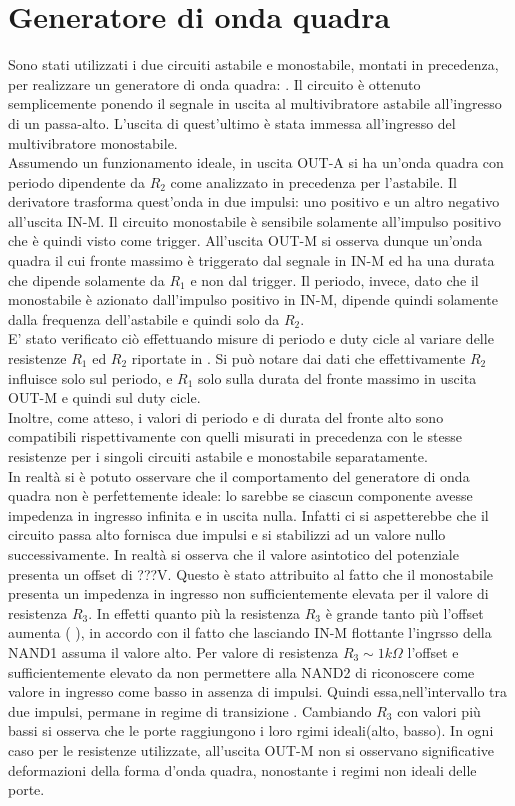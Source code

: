 \section{Generatore di onda quadra}
Sono stati utilizzati i due circuiti astabile e monostabile, montati in precedenza, per realizzare un generatore di onda quadra: . Il circuito è ottenuto semplicemente ponendo il segnale in uscita al multivibratore astabile all'ingresso di un passa-alto. L'uscita di quest'ultimo è stata immessa all'ingresso del multivibratore monostabile. \\
Assumendo un funzionamento ideale, in uscita OUT-A si ha un'onda quadra con periodo dipendente da $R_{2}$ come analizzato in precedenza per l'astabile. Il derivatore trasforma quest'onda in due impulsi: uno positivo e un altro negativo all'uscita IN-M. Il circuito monostabile è sensibile solamente all'impulso positivo che è quindi visto come trigger.
 All'uscita OUT-M si osserva dunque un'onda quadra il cui fronte massimo è triggerato dal segnale in IN-M ed ha una durata che dipende solamente da $R_{1}$ e non dal trigger. Il periodo, invece, dato che il monostabile è azionato dall'impulso positivo in IN-M, dipende quindi solamente dalla frequenza dell'astabile e quindi solo da $R_{2}$.\\
 E' stato verificato ciò effettuando misure di periodo e duty cicle al variare delle resistenze $R_{1}$ ed $R_{2}$ riportate in \tab{}. Si può notare dai dati che effettivamente $R_{2}$ influisce solo sul periodo, e $R_{1}$ solo sulla durata del fronte massimo in uscita OUT-M e quindi sul duty cicle. \\
 Inoltre, come atteso, i valori di periodo e di durata del fronte alto sono compatibili rispettivamente con quelli misurati in precedenza con le stesse resistenze per i singoli circuiti astabile e monostabile separatamente.\\
 In realtà si è potuto osservare che il comportamento del generatore di onda quadra non è perfettemente ideale: lo sarebbe se ciascun componente avesse impedenza in ingresso infinita e in uscita nulla. Infatti ci si aspetterebbe che il circuito passa alto fornisca due impulsi e si stabilizzi ad un valore nullo successivamente. In realtà si osserva che il valore asintotico del potenziale presenta un offset di ???V. Questo è stato attribuito al fatto che il monostabile presenta un impedenza in ingresso non sufficientemente elevata per il valore di resistenza $R_{3}$. In effetti quanto più la resistenza $R_{3}$ è grande tanto più l'offset aumenta (\tab{} ), in accordo con il fatto che lasciando IN-M flottante l'ingrsso della NAND1 assuma il valore alto. Per valore di resistenza $R_{3} \sim 1 k\Omega$ l'offset e sufficientemente elevato da non permettere alla NAND2 di riconoscere come valore in ingresso come basso in assenza di impulsi. Quindi essa,nell'intervallo tra due impulsi, permane in regime di transizione . Cambiando $R_{3}$ con valori più bassi si osserva che le porte raggiungono i loro rgimi ideali(alto, basso). In ogni caso per le resistenze utilizzate, all'uscita OUT-M non si osservano significative deformazioni della forma d'onda quadra, nonostante i regimi non ideali delle porte.\\
